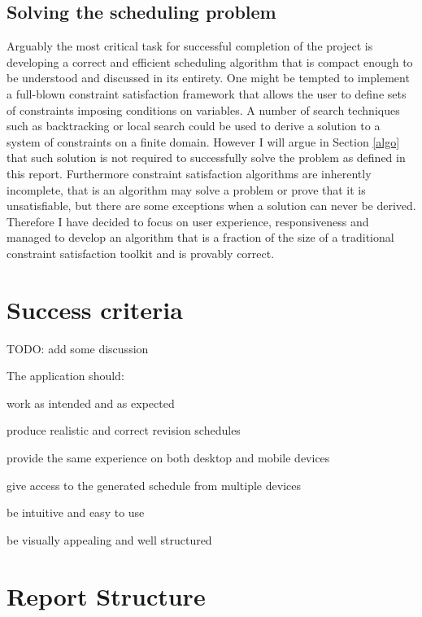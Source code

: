 \documentclass[bsc,frontabs,twoside,singlespacing,parskip]{infthesis}     %
\begin{document}
		\subsection{Solving the scheduling problem}

			Arguably the most critical task for successful completion of the project is developing a correct and efficient scheduling algorithm that is compact enough to be understood and discussed in its entirety. One might be tempted to implement a full-blown constraint satisfaction framework that allows the user to define sets of constraints imposing conditions on variables. A number of search techniques such as backtracking or local search could be used to derive a solution to a system of constraints on a finite domain. However I will argue in Section \ref{algo} that such solution is not required to successfully solve the problem as defined in this report. Furthermore constraint satisfaction algorithms are inherently incomplete, that is an algorithm may solve a problem or prove that it is unsatisfiable, but there are some exceptions when a solution can never be derived. Therefore I have decided to focus on user experience, responsiveness and managed to develop an algorithm that is a fraction of the size of a traditional constraint satisfaction toolkit and is provably correct.

	\section{Success criteria} \label{success_criteria}

		TODO: add some discussion

		The application should:
		\begin{compactitem}
			\item work as intended and as expected
			\item produce realistic and correct revision schedules
			\item provide the same experience on both desktop and mobile devices
			\item give access to the generated schedule from multiple devices
			\item be intuitive and easy to use
			\item be visually appealing and well structured
		\end{compactitem}

	\section{Report Structure}
\end{document}
